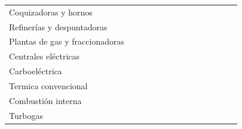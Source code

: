 \documentclass{sener2025}
\begin{document}
\begin{tabladoradoLargo}
\begin{xltabular}{\textwidth}{QZZZZZZZZZZZZZ}
    \hspace{1.35em} Coquizadoras y hornos &  &  &  &  &  &  &  &  &  &  &  &  &  \\
    \hspace{1.35em} Refinerías y despuntadoras &  &  &  &  &  &  &  &  &  &  &  &  &  \\
    \hspace{1.35em} Plantas de gas y fraccionadoras &  &  &  &  &  &  &  &  &  &  &  &  &  \\
    \hspace{1.35em} Centrales eléctricas &  &  &  &  &  &  &  &  &  &  &  &  &  \\
    \hspace{2.7em} Carboeléctrica &  &  &  &  &  &  &  &  &  &  &  &  &  \\
    \hspace{2.7em} Termica convencional &  &  &  &  &  &  &  &  &  &  &  &  &  \\
    \hspace{2.7em} Combustión interna &  &  &  &  &  &  &  &  &  &  &  &  &  \\
    \hspace{2.7em} Turbogas &  &  &  &  &  &  &  &  &  &  &  &  &  \\

\end{xltabular}
\end{tabladoradoLargo}
\end{document}
